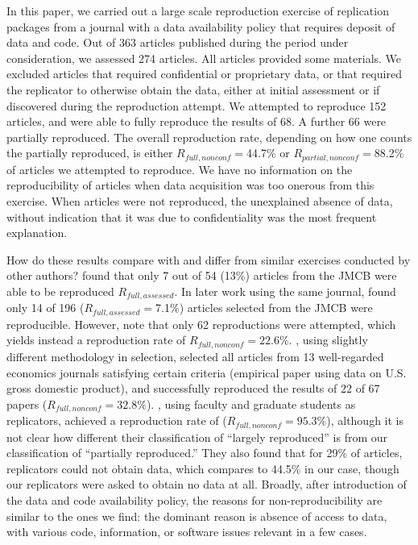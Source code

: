 \documentclass{cje} %
\theoremstyle{plain}%
\theoremstyle{definition}
\theoremstyle{remark}
\begin{document}
In this paper, we carried out a large scale reproduction exercise of replication packages from a journal with a data availability policy that requires deposit of data and code. Out of 363 articles published during the period under consideration, we assessed 274 articles. All articles provided some materials. We excluded articles that required confidential or proprietary data, or that required the replicator to otherwise obtain the data, either at initial assessment or if discovered during the reproduction attempt. 
%
We attempted to reproduce 152 articles, and were able to fully reproduce the results of 68. A further 66 were partially reproduced. The overall reproduction rate, depending on how one counts the partially reproduced, is either $R_{{full},{nonconf}} = $44.7$\%$ or  $R_{{partial},{nonconf}} = $88.2\% of articles we attempted to reproduce. We have no information on the reproducibility of articles when data acquisition was too onerous from this exercise. When articles were not reproduced, the  unexplained absence of data, without indication that it was due to confidentiality was the most frequent explanation. 

How do these results compare with and differ from similar exercises conducted by other authors? %
\cite{Dewald1986} found that only 7 out of 54 (13\%) articles from the \ac{JMCB} were able to be reproduced $R_{{full},{assessed}}$. 
%
In later work using the same journal, \cite{McCullough2006} found only 14 of 196 ($R_{{full},{assessed}} =$7.1\%) articles selected from the \ac{JMCB} were reproducible. However,  \cite{McCullough2006} note that only 62 reproductions were attempted, which yields instead a reproduction rate of $R_{{full},{nonconf}} = 22.6\%$. 
\cite{ChangLi2015}, using slightly different methodology in selection, selected all articles from 13 well-regarded economics journals satisfying certain criteria (empirical paper using data on U.S. gross domestic product), and successfully reproduced the results of 22 of 67 papers ($R_{{full},{nonconf}} = 32.8\%$). \cite{greiner2023}, using faculty and graduate students as replicators, achieved a reproduction rate of ($R_{{full},{nonconf}} = 95.3\%$), although it is not clear how different their classification of ``largely reproduced'' is from our classification of ``partially reproduced.'' They also found that for 29\% of articles, replicators could not obtain data, which compares to 44.5\% in our case, though our replicators were asked to obtain no data at all. Broadly, after introduction of the data and code availability policy, the reasons for non-reproducibility are similar to the ones we find: the dominant reason is absence of access to data, with various code, information, or software issues relevant in a few cases.
\end{document}
